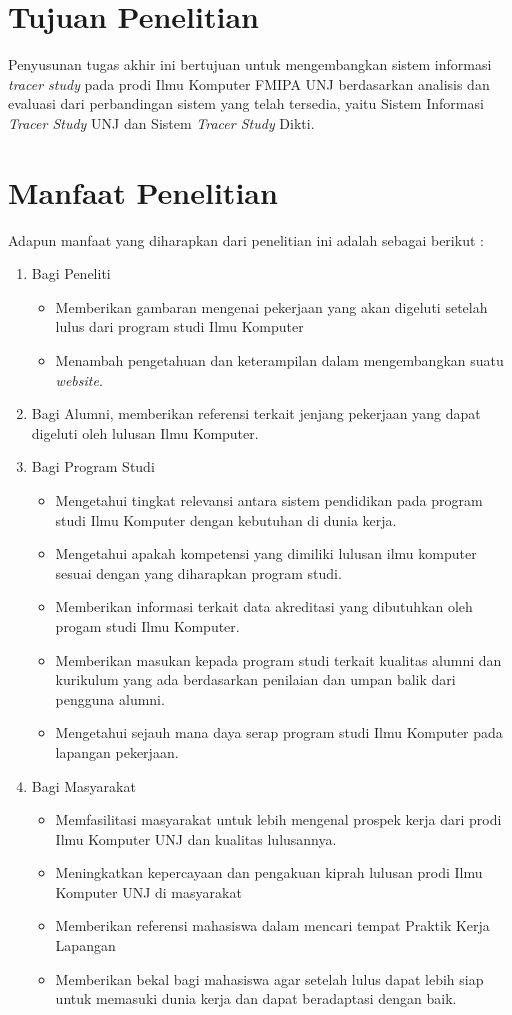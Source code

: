 \section{Tujuan Penelitian}
Penyusunan tugas akhir ini bertujuan untuk mengembangkan sistem informasi \textit{tracer study} pada prodi Ilmu Komputer FMIPA UNJ berdasarkan analisis dan evaluasi dari perbandingan sistem yang telah tersedia, yaitu Sistem Informasi \textit{Tracer Study} UNJ dan Sistem \textit{Tracer Study} Dikti.

\section{Manfaat Penelitian}
Adapun manfaat yang diharapkan dari penelitian ini adalah sebagai berikut :
	\begin{enumerate}
		\item Bagi Peneliti
		\begin{itemize}
			\item Memberikan gambaran mengenai pekerjaan yang akan digeluti setelah lulus dari program studi Ilmu Komputer
			\item Menambah pengetahuan dan keterampilan dalam mengembangkan suatu \textit{website}.
		\end{itemize}	
		\item Bagi Alumni, memberikan referensi terkait jenjang pekerjaan yang dapat digeluti oleh lulusan Ilmu Komputer. 
		\item Bagi Program Studi
		\begin{itemize}
			\item Mengetahui tingkat relevansi antara sistem pendidikan pada program studi Ilmu Komputer dengan kebutuhan di dunia kerja. 
			\item Mengetahui apakah kompetensi yang dimiliki lulusan ilmu komputer sesuai dengan yang diharapkan program studi. 
			\item Memberikan informasi terkait data akreditasi yang dibutuhkan oleh progam studi Ilmu Komputer. 
			\item Memberikan masukan kepada program studi terkait kualitas alumni dan kurikulum yang ada berdasarkan penilaian dan umpan balik dari pengguna alumni.
			\item Mengetahui sejauh mana daya serap program studi Ilmu Komputer pada lapangan pekerjaan. 
		\end{itemize}  	
		\item Bagi Masyarakat
		\begin{itemize}
			\item Memfasilitasi masyarakat untuk lebih mengenal prospek kerja dari prodi Ilmu Komputer UNJ dan kualitas lulusannya.
			\item Meningkatkan kepercayaan dan pengakuan kiprah lulusan prodi Ilmu Komputer UNJ di masyarakat
			\item Memberikan referensi mahasiswa dalam mencari tempat Praktik Kerja Lapangan 
			\item Memberikan bekal bagi mahasiswa agar setelah lulus dapat lebih siap untuk memasuki dunia kerja dan dapat beradaptasi dengan baik.
		\end{itemize} 
	\end{enumerate}
		
\begin{comment}

\end{comment}
